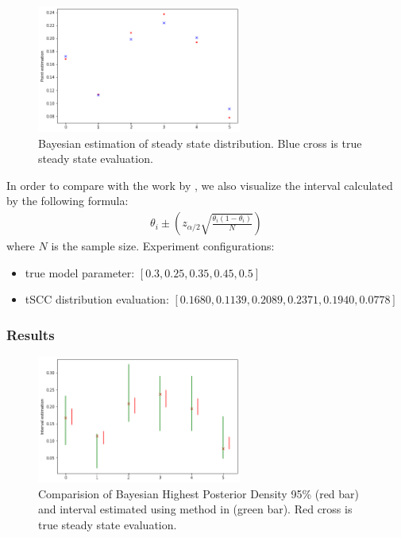 \documentclass[12pt]{article}
\theoremstyle{definition}
\begin{document}
\begin{figure}[H]
  \centering
  \includegraphics[width=0.6\textwidth,keepaspectratio]{figures/point_estimation.png}
  \caption{Bayesian estimation of steady state distribution. Blue cross is true
    steady state evaluation.}
\end{figure}
In order to compare with the work by \cite{hajnal2019data}, we also visualize
the interval calculated by the following formula:
\begin{align*}
  \theta_i \pm (z_{\alpha / 2}\sqrt{\frac{\theta_i(1-\theta_i)}{N}})
\end{align*}
where $N$ is the sample size. Experiment configurations:
\begin{itemize}
\item true model parameter: $[0.3, 0.25, 0.35, 0.45, 0.5]$
\item tSCC distribution evaluation: $[0.1680, 0.1139, 0.2089, 0.2371, 0.1940, 0.0778]$ 
\end{itemize}
\subsubsection{Results}

\begin{figure}[H]
  \centering
  \includegraphics[width=0.6\textwidth,keepaspectratio]{figures/interval_estimation.png}
  \caption{Comparision of Bayesian Highest Posterior Density 95\% (red bar) and interval
    estimated using method in \cite{hajnal2019data} (green bar). Red cross is
    true steady state evaluation.}
\end{figure}
\end{document}
